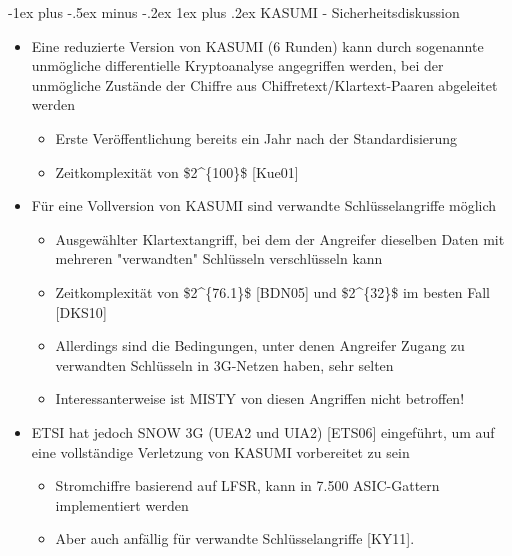 \documentclass[a4paper]{article}
\makeatletter
\renewcommand{\subsubsection}{\@startsection{subsubsection}{3}{0mm}%
 {-1ex plus -.5ex minus -.2ex}%
 {1ex plus .2ex}%
 {\normalfont\small\bfseries}}
\makeatother
\begin{document}
\begin{multicols}{3}
    \subsubsection{KASUMI -
        Sicherheitsdiskussion}

    \begin{itemize}
        \item
              Eine reduzierte Version von KASUMI (6 Runden) kann durch sogenannte
              unmögliche differentielle Kryptoanalyse angegriffen werden, bei der
              unmögliche Zustände der Chiffre aus Chiffretext/Klartext-Paaren
              abgeleitet werden

              \begin{itemize}
                  \item
                        Erste Veröffentlichung bereits ein Jahr nach der Standardisierung
                  \item
                        Zeitkomplexität von \$2\^{}\{100\}\$ {[}Kue01{]}
              \end{itemize}
        \item
              Für eine Vollversion von KASUMI sind verwandte Schlüsselangriffe
              möglich

              \begin{itemize}
                  \item
                        Ausgewählter Klartextangriff, bei dem der Angreifer dieselben Daten
                        mit mehreren "verwandten" Schlüsseln verschlüsseln kann
                  \item
                        Zeitkomplexität von \$2\^{}\{76.1\}\$ {[}BDN05{]} und
                        \$2\^{}\{32\}\$ im besten Fall {[}DKS10{]}
                  \item
                        Allerdings sind die Bedingungen, unter denen Angreifer Zugang zu
                        verwandten Schlüsseln in 3G-Netzen haben, sehr selten
                  \item
                        Interessanterweise ist MISTY von diesen Angriffen nicht betroffen!
              \end{itemize}
        \item
              ETSI hat jedoch SNOW 3G (UEA2 und UIA2) {[}ETS06{]} eingeführt, um auf
              eine vollständige Verletzung von KASUMI vorbereitet zu sein

              \begin{itemize}
                  \item
                        Stromchiffre basierend auf LFSR, kann in 7.500 ASIC-Gattern
                        implementiert werden
                  \item
                        Aber auch anfällig für verwandte Schlüsselangriffe {[}KY11{]}.
              \end{itemize}
    \end{itemize}



\end{multicols}
\end{document}
